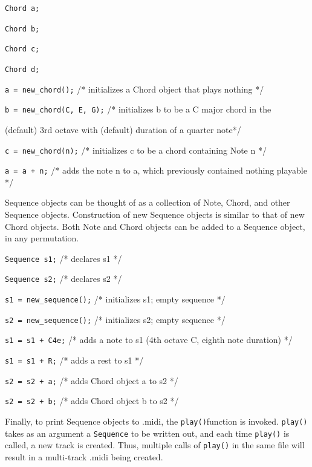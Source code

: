 \documentclass[12pt,A4]{book}
\begin{document}
\vspace{5 mm}

\verb|Chord a;|

\verb|Chord b;|

\verb|Chord c;|

\verb|Chord d;|

\verb|a = new_chord();| /* initializes a Chord object that plays nothing */

\verb|b = new_chord(C, E, G);| /* initializes b to be a C major chord in the 

\indent \indent \indent (default) 3rd octave with (default) duration of a quarter note*/

\verb|c = new_chord(n);| /* initializes c to be a chord containing Note n */

\verb|a = a + n;| /* adds the note n to a, which previously contained nothing playable */

\vspace{5 mm}

\noindent Sequence objects can be thought of as a collection of Note, Chord, and other Sequence objects. Construction of new Sequence objects is similar to that of new Chord objects. Both Note and Chord objects can be added to a Sequence object, in any permutation.

\vspace{5 mm}

\verb|Sequence s1;| /* declares s1 */

\verb|Sequence s2;| /* declares s2 */

\verb|s1 = new_sequence();|  /* initializes s1; empty sequence */

\verb|s2 = new_sequence();|  /* initializes s2; empty sequence */

\verb|s1 = s1 + C4e;| /* adds a note to s1 (4th octave C, eighth note duration) */

\verb|s1 = s1 + R;| /* adds a rest to s1 */

\verb|s2 = s2 + a;| /* adds Chord object a to s2 */

\verb|s2 = s2 + b;| /* adds Chord object b to s2 */

\vspace{5 mm}

\noindent Finally, to print Sequence objects to .midi, the \verb|play()|function is invoked. \verb|play()| takes as an argument a \verb|Sequence| to be written out, and each time \verb|play()| is called, a new track is created. Thus, multiple calls of \verb|play()| in the same file will result in a multi-track .midi being created.
\end{document}
